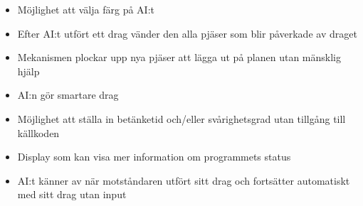 \documentclass[a4paper]{article}
\begin{document}
\begin{itemize}
    \item Möjlighet att välja färg på AI:t
    \item Efter AI:t utfört ett drag vänder den alla pjäser som blir påverkade av draget
    \item Mekanismen plockar upp nya pjäser att lägga ut på planen utan mänsklig hjälp
    \item AI:n gör smartare drag
    \item Möjlighet att ställa in betänketid och/eller svårighetsgrad utan tillgång till källkoden
    \item Display som kan visa mer information om programmets status
    \item AI:t känner av när motståndaren utfört sitt drag och fortsätter automatiskt med sitt drag utan input
\end{itemize}
\end{document}
